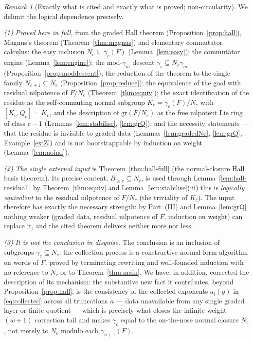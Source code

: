 \documentclass{amsart}
\theoremstyle{definition}
\theoremstyle{remark}
\newtheorem{remark}{Remark}
\begin{document}
\begin{remark}[Exactly what is cited and exactly what is proved; non-circularity]
\label{rem:noncircular}
We delimit the logical dependence precisely.

\emph{(1) Proved here in full,} from the graded Hall theorem
(Proposition~\ref{prop:hall}), Magnus's theorem (Theorem~\ref{thm:magnus}) and
elementary commutator calculus: the easy inclusion $N_c\subseteq\gamma_c(F)$
(Lemma~\ref{lem:easy}); the commutator engine (Lemma~\ref{lem:engine}); the
mod-$\gamma_m$ descent $\gamma_c\subseteq N_c\gamma_m$
(Proposition~\ref{prop:moddescent}); the reduction of the theorem to the single
family $N_{c+1}\subseteq N_c$ (Proposition~\ref{prop:reduce}); the equivalence of
the goal with residual nilpotence of $F/N_c$ (Theorem~\ref{thm:equiv}); the exact
identification of the residue as the self-commuting normal subgroup
$K_c=\gamma_c(F)/N_c$ with $[K_c,Q_c]=K_c$, and the description of
$\mathrm{gr}(F/N_c)$ as the free nilpotent Lie ring of class $c-1$
(Lemmas~\ref{lem:stabilise}, \ref{lem:grQ}); and the necessity statements --- that
the residue is invisible to graded data (Lemmas~\ref{lem:gradedNc}, \ref{lem:grQ},
Example~\ref{ex:Z}) and is not bootstrappable by induction on weight
(Lemma~\ref{lem:noind}).

\emph{(2) The single external input} is Theorem~\ref{thm:hall-full} (the
normal-closure Hall basis theorem). Its precise content, $B_{\ge c}\subseteq N_c$,
is used through Lemma~\ref{lem:hall-residual}; by Theorem~\ref{thm:equiv} and
Lemma~\ref{lem:stabilise}(iii) this is \emph{logically equivalent} to the residual
nilpotence of $F/N_c$ (the triviality of $K_c$). The input therefore has exactly
the necessary strength: by Part~(III) and Lemma~\ref{lem:grQ} nothing weaker
(graded data, residual nilpotence of $F$, induction on weight) can replace it, and
the cited theorem delivers neither more nor less.

\emph{(3) It is not the conclusion in disguise.} The conclusion is an inclusion of
subgroups $\gamma_c\subseteq N_c$; the collection process is a constructive
normal-form algorithm on words of $F$, proved by terminating rewriting and
well-founded induction with no reference to $N_c$ or to Theorem~\ref{thm:main}. We
have, in addition, corrected the description of its mechanism: the substantive new
fact it contributes, beyond Proposition~\ref{prop:hall}, is the consistency of the
collected exponents $a_i(g)$ in \eqref{eq:collected} across all truncations $n$ ---
data unavailable from any single graded layer or finite quotient --- which is
precisely what closes the infinite weight-$(w{+}1)$ correction tail and makes
$\gamma_c$ equal to the on-the-nose normal closure $N_c$, not merely to $N_c$
modulo each $\gamma_{n+1}(F)$.
\end{remark}
\end{document}
